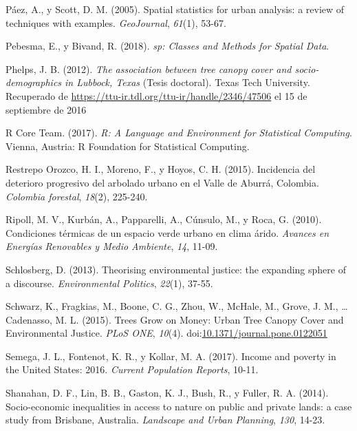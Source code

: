 \documentclass[12pt,a4paper,openany]{book}
\theoremstyle{definition}
\theoremstyle{definition}
\theoremstyle{definition}
\theoremstyle{remark}
\begin{document}
\hypertarget{ref-paez_spatial_2005}{}
Páez, A., y Scott, D. M. (2005). Spatial statistics for urban analysis:
a review of techniques with examples. \emph{GeoJournal}, \emph{61}(1),
53-67.

\hypertarget{ref-R-sp}{}
Pebesma, E., y Bivand, R. (2018). \emph{sp: Classes and Methods for
Spatial Data}.

\hypertarget{ref-phelps_association_2012}{}
Phelps, J. B. (2012). \emph{The association between tree canopy cover
and socio-demographics in Lubbock, Texas} (Tesis doctoral). Texas Tech
University. Recuperado de
\url{https://ttu-ir.tdl.org/ttu-ir/handle/2346/47506} el 15 de
septiembre de 2016

\hypertarget{ref-R-base}{}
R Core Team. (2017). \emph{R: A Language and Environment for Statistical
Computing}. Vienna, Austria: R Foundation for Statistical Computing.

\hypertarget{ref-restrepo_incidence_2015}{}
Restrepo Orozco, H. I., Moreno, F., y Hoyos, C. H. (2015). Incidencia
del deterioro progresivo del arbolado urbano en el Valle de Aburrá,
Colombia. \emph{Colombia forestal}, \emph{18}(2), 225-240.

\hypertarget{ref-ripoll_condiciones_2010}{}
Ripoll, M. V., Kurbán, A., Papparelli, A., Cúnsulo, M., y Roca, G.
(2010). Condiciones térmicas de un espacio verde urbano en clima árido.
\emph{Avances en Energías Renovables y Medio Ambiente}, \emph{14},
11-09.

\hypertarget{ref-schlosberg_theorising_2013}{}
Schlosberg, D. (2013). Theorising environmental justice: the expanding
sphere of a discourse. \emph{Environmental Politics}, \emph{22}(1),
37-55.

\hypertarget{ref-schwarz_trees_2015}{}
Schwarz, K., Fragkias, M., Boone, C. G., Zhou, W., McHale, M., Grove, J.
M., \ldots{} Cadenasso, M. L. (2015). Trees Grow on Money: Urban Tree
Canopy Cover and Environmental Justice. \emph{PLoS ONE}, \emph{10}(4).
doi:\href{https://doi.org/10.1371/journal.pone.0122051}{10.1371/journal.pone.0122051}

\hypertarget{ref-semega2017income}{}
Semega, J. L., Fontenot, K. R., y Kollar, M. A. (2017). Income and
poverty in the United States: 2016. \emph{Current Population Reports},
10-11.

\hypertarget{ref-shanahan_socio-economic_2014}{}
Shanahan, D. F., Lin, B. B., Gaston, K. J., Bush, R., y Fuller, R. A.
(2014). Socio-economic inequalities in access to nature on public and
private lands: a case study from Brisbane, Australia. \emph{Landscape
and Urban Planning}, \emph{130}, 14-23.
\end{document}
